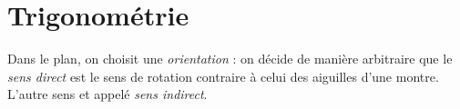 \documentclass[a4paper,11pt,cours]{nsi} %
\begin{document}
\setcounter{chapter}{6} %



\chapter{Trigonométrie}


\setlength{\columnseprule}{0.5pt}
\setlength{\columnsep}{1cm}

Dans le plan, on choisit une \emph{orientation} : on décide de manière arbitraire que le \emph{sens direct} est le sens de 
rotation contraire à celui des aiguilles d'une montre. L'autre sens et appelé \emph{sens indirect}.
\begin{center}
	\hspace*{2cm}
\end{center}
\end{document}
